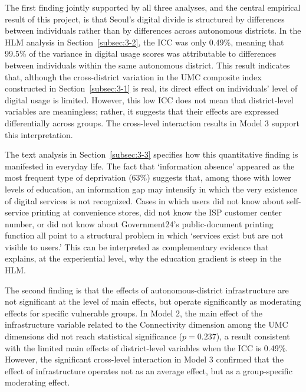 The first finding jointly supported by all three analyses, and the central empirical result of this project, is that Seoul's digital divide is structured by differences between individuals rather than by differences across autonomous districts. In the HLM analysis in Section~\ref{subsec:3-2}, the ICC was only 0.49\%, meaning that 99.5\% of the variance in digital usage scores was attributable to differences between individuals within the same autonomous district. This result indicates that, although the cross-district variation in the UMC composite index constructed in Section~\ref{subsec:3-1} is real, its direct effect on individuals' level of digital usage is limited. However, this low ICC does not mean that district-level variables are meaningless; rather, it suggests that their effects are expressed differentially across groups. The cross-level interaction results in Model 3 support this interpretation.

The text analysis in Section~\ref{subsec:3-3} specifies how this quantitative finding is manifested in everyday life. The fact that `information absence' appeared as the most frequent type of deprivation (63\%) suggests that, among those with lower levels of education, an information gap may intensify in which the very existence of digital services is not recognized. Cases in which users did not know about self-service printing at convenience stores, did not know the ISP customer center number, or did not know about Government24's public-document printing function all point to a structural problem in which `services exist but are not visible to users.' This can be interpreted as complementary evidence that explains, at the experiential level, why the education gradient is steep in the HLM.

The second finding is that the effects of autonomous-district infrastructure are not significant at the level of main effects, but operate significantly as moderating effects for specific vulnerable groups. In Model 2, the main effect of the infrastructure variable related to the Connectivity dimension among the UMC dimensions did not reach statistical significance ($p = 0.237$), a result consistent with the limited main effects of district-level variables when the ICC is 0.49\%. However, the significant cross-level interaction in Model 3 confirmed that the effect of infrastructure operates not as an average effect, but as a group-specific moderating effect.

